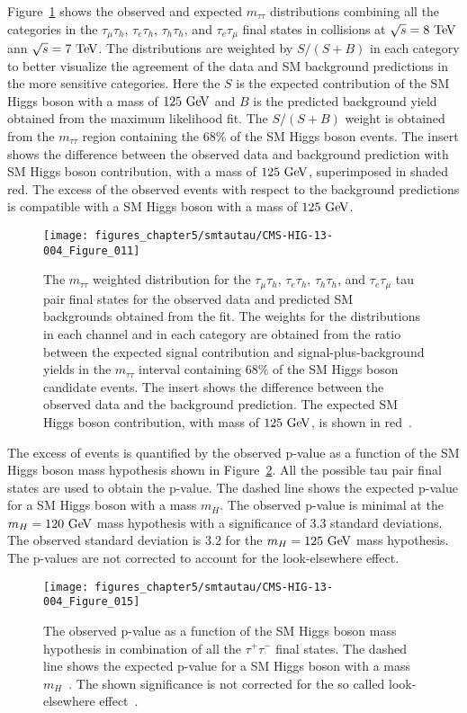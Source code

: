 Figure~\ref{fig:mass_plot} shows the observed and expected $m_{\tau\tau}$ distributions combining all the categories in the $\tau_{\mu}\tau_{h}$, $\tau_{e}\tau_{h}$, $\tau_{h}\tau_{h}$, and $\tau_{e}\tau_{\mu}$ final states in collisions at $\sqrt{s}=8~\mathrm{Te\kern -0.1em V}$ ann $\sqrt{s}=7~\mathrm{Te\kern -0.1em V}$. The distributions are weighted by $S/(S+B)$ in each category to better visualize the agreement of the data and SM background predictions in the more sensitive categories. Here the $S$ is the expected contribution of the SM Higgs boson with a mass of $125~\mathrm{Ge\kern -0.1em V}$ and $B$ is the predicted background yield obtained from the maximum likelihood fit. The $S/(S+B)$ weight is obtained from the $m_{\tau\tau}$ region containing the $68\%$ of the SM Higgs boson events. The insert shows the difference between the observed data and background prediction with SM Higgs boson contribution, with a mass of $125~\mathrm{Ge\kern -0.1em V}$, superimposed in shaded red. The excess of the observed events with respect to the background predictions is compatible with a SM Higgs boson with a mass of $125~\mathrm{Ge\kern -0.1em V}$.
\begin{figure}[htbp]
\centering
\texttt{[image: figures\_chapter5/smtautau/CMS-HIG-13-004\_Figure\_011]}
\caption{The $m_{\tau\tau}$ weighted distribution for the $\tau_{\mu}\tau_{h}$, $\tau_{e}\tau_{h}$, $\tau_{h}\tau_{h}$, and  $\tau_{e}\tau_{\mu}$ tau pair final states for the observed data and predicted SM backgrounds obtained from the fit. The weights for the distributions in each channel and in each category are obtained from the ratio between the expected signal contribution and signal-plus-background yields in the $m_{\tau\tau}$ interval containing $68\%$ of the SM Higgs boson candidate events. The insert shows the difference between the observed data and the background prediction. The expected SM Higgs boson contribution, with mass of $125~\mathrm{Ge\kern -0.1em V}$, is shown in red~\cite{Chatrchyan:2014nva}.}
\label{fig:mass_plot}
\end{figure}

The excess of events is quantified by the observed p-value as a function of the SM Higgs boson mass hypothesis shown in Figure~\ref{fig:money}. All the possible tau pair final states are used to obtain the p-value. The dashed line shows the expected p-value for a SM Higgs boson with a mass $m_{H}$. The observed p-value is minimal at the $m_{H}=120~\mathrm{Ge\kern -0.1em V}$ mass hypothesis with a significance of $3.3$ standard deviations. The observed standard deviation is $3.2$ for the $m_{H}=125~\mathrm{Ge\kern -0.1em V}$ mass hypothesis. The p-values are not corrected to account for the look-elsewhere effect.
\begin{figure}[htbp]
\centering
\texttt{[image: figures\_chapter5/smtautau/CMS-HIG-13-004\_Figure\_015]}
\caption{The observed p-value as a function of the SM Higgs boson mass hypothesis in combination of all the $\tau^{+}\tau^{-}$ final states. The dashed line shows the expected p-value for a SM Higgs boson with a mass $m_{H}$~\cite{Chatrchyan:2014nva}. The shown significance is not corrected for the so called look-elsewhere effect~\cite{loook}.}
\label{fig:money}
\end{figure}


